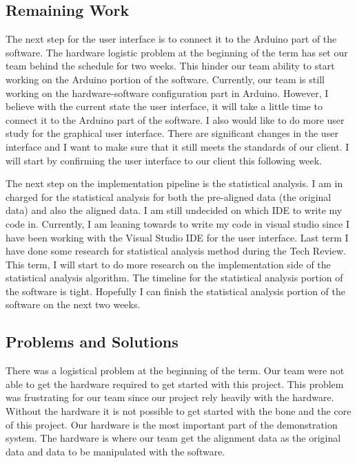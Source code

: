 \subsection{Remaining Work}
The next step for the user interface is to connect it to the Arduino part of the software. The hardware logistic problem at the beginning of the term has set our team behind the schedule for two weeks. This hinder our team ability to start working on the Arduino portion of the software. Currently, our team is still working on the hardware-software configuration part in Arduino. However, I believe with the current state the user interface, it will take a little time to connect it to the Arduino part of the software. I also would like to do more user study for the graphical user interface. There are significant changes in the user interface and I want to make sure that it still meets the standards of our client. I will start by confirming the user interface to our client this following week.

The next step on the implementation pipeline is the statistical analysis. I am in charged for the statistical analysis for both the pre-aligned data (the original data) and also the aligned data. I am still undecided on which IDE to write my code in. Currently, I am leaning towards to write my code in visual studio since I have been working with the Visual Studio IDE for the user interface. Last term I have done some research for statistical analysis method during the Tech Review. This term, I will start to do more research on the implementation side of the statistical analysis algorithm. The timeline for the statistical analysis portion of the software is tight. Hopefully I can finish the statistical analysis portion of the software on the next two weeks. 

\subsection{Problems and Solutions}
There was a logistical problem at the beginning of the term. Our team were not able to get the hardware required to get started with this project. This problem was frustrating for our team since our project rely heavily with the hardware. Without the hardware it is not possible to get started with the bone and the core of this project. Our hardware is the most important part of the demonstration system. The hardware is where our team get the alignment data as the original data and data to be manipulated with the software.\\

